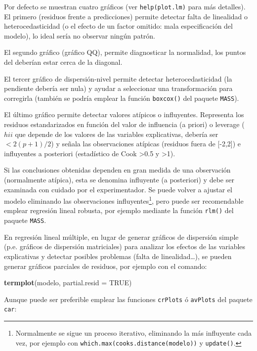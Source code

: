 \documentclass[
]{book}
\newenvironment{Shaded}{\begin{snugshade}}{\end{snugshade}}
\newcommand{\DataTypeTok}[1]{\textcolor[rgb]{0.13,0.29,0.53}{#1}}
\newcommand{\KeywordTok}[1]{\textcolor[rgb]{0.13,0.29,0.53}{\textbf{#1}}}
\newcommand{\NormalTok}[1]{#1}
\newcommand{\OtherTok}[1]{\textcolor[rgb]{0.56,0.35,0.01}{#1}}
\theoremstyle{break}
\theoremstyle{definition}
\theoremstyle{definition}
\theoremstyle{definition}
\theoremstyle{remark}
\begin{document}
Por defecto se muestran cuatro gráficos (ver \texttt{help(plot.lm)} para más detalles).
El primero (residuos frente a predicciones) permite detectar falta de
linealidad o heterocedasticidad (o el efecto de un factor omitido: mala
especificación del modelo), lo ideal sería no observar ningún patrón.

El segundo gráfico (gráfico QQ), permite diagnosticar la normalidad,
los puntos del deberían estar cerca de la diagonal.

El tercer gráfico de dispersión-nivel permite detectar heterocedasticidad (la pendiente debería ser nula) y ayudar a seleccionar una transformación para corregirla (también se podría emplear la función \texttt{boxcox()} del paquete \texttt{MASS}).

El último gráfico permite detectar valores atípicos o influyentes. Representa los residuos estandarizados en función del valor de influencia (a priori) o leverage (\(hii\) que depende de los valores de las variables explicativas, debería ser \(< 2(p+1)/2\)) y señala las observaciones atípicas (residuos fuera de {[}-2,2{]}) e influyentes a posteriori (estadístico de Cook \textgreater0.5 y \textgreater1).

Si las conclusiones obtenidas dependen en gran medida de una
observación (normalmente atípica), esta se denomina influyente (a
posteriori) y debe ser examinada con cuidado por el experimentador.
Se puede volver a ajustar el modelo eliminando las observaciones influyentes\footnote{Normalmente se sigue un proceso iterativo, eliminando la más influyente cada vez, por ejemplo con \texttt{which.max(cooks.distance(modelo))} y \texttt{update()}.},
pero puede ser recomendable emplear regresión lineal robusta,
por ejemplo mediante la función \texttt{rlm()} del paquete \texttt{MASS}.

En regresión lineal múltiple, en lugar de generar gráficos de dispersión simple
(p.e. gráficos de dispersión matriciales) para analizar los efectos de las variables explicativas y
detectar posibles problemas (falta de linealidad\ldots),
se pueden generar gráficos parciales de residuos, por ejemplo con el comando:

\begin{Shaded}
\begin{Highlighting}[]
\KeywordTok{termplot}\NormalTok{(modelo, }\DataTypeTok{partial.resid =} \OtherTok{TRUE}\NormalTok{)}
\end{Highlighting}
\end{Shaded}

Aunque puede ser preferible emplear las funciones \texttt{crPlots} ó \texttt{avPlots} del paquete \texttt{car}:
\end{document}
